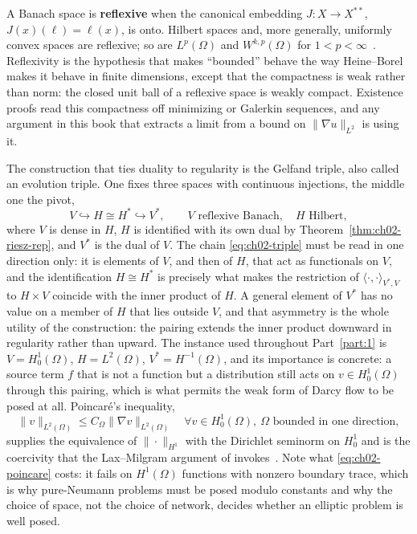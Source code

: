 A Banach space is \textbf{reflexive} when the canonical embedding $J : X \to X^{**}$, $J(x)(\ell) = \ell(x)$, is onto. Hilbert spaces and, more generally, uniformly convex spaces are reflexive; so are $L^p(\Omega)$ and $W^{k,p}(\Omega)$ for $1 < p < \infty$~\cite{brezis2011functional}. Reflexivity is the hypothesis that makes ``bounded'' behave the way Heine--Borel makes it behave in finite dimensions, except that the compactness is weak rather than norm: the closed unit ball of a reflexive space is weakly compact. Existence proofs read this compactness off minimizing or Galerkin sequences, and any argument in this book that extracts a limit from a bound on $\|\nabla u\|_{L^2}$ is using it.

The construction that ties duality to regularity is the Gelfand triple, also called an evolution triple. One fixes three spaces with continuous injections, the middle one the pivot,
\begin{equation}
  V \hookrightarrow H \cong H^* \hookrightarrow V^* , \qquad
  V \text{ reflexive Banach}, \quad H \text{ Hilbert},
  \label{eq:ch02-triple}
\end{equation}
where $V$ is dense in $H$, $H$ is identified with its own dual by Theorem~\ref{thm:ch02-riesz-rep}, and $V^*$ is the dual of $V$. The chain \eqref{eq:ch02-triple} must be read in one direction only: it is elements of $V$, and then of $H$, that act as functionals on $V$, and the identification $H \cong H^*$ is precisely what makes the restriction of $\langle \cdot, \cdot \rangle_{V^*, V}$ to $H \times V$ coincide with the inner product of $H$. A general element of $V^*$ has no value on a member of $H$ that lies outside $V$, and that asymmetry is the whole utility of the construction: the pairing extends the inner product downward in regularity rather than upward. The instance used throughout Part~\ref{part:1} is $V = H^1_0(\Omega)$, $H = L^2(\Omega)$, $V^* = H^{-1}(\Omega)$, and its importance is concrete: a source term $f$ that is not a function but a distribution still acts on $v \in H^1_0(\Omega)$ through this pairing, which is what permits the weak form of Darcy flow to be posed at all. Poincar\'e's inequality,
\begin{equation}
  \|v\|_{L^2(\Omega)} \le C_\Omega \|\nabla v\|_{L^2(\Omega)} \quad \forall v \in H^1_0(\Omega), \ \Omega \text{ bounded in one direction},
  \label{eq:ch02-poincare}
\end{equation}
supplies the equivalence of $\|\cdot\|_{H^1}$ with the Dirichlet seminorm on $H^1_0$ and is the coercivity that the Lax--Milgram argument of  invokes~\cite{evans2010partial}. Note what \eqref{eq:ch02-poincare} costs: it fails on $H^1(\Omega)$ functions with nonzero boundary trace, which is why pure-Neumann problems must be posed modulo constants and why the choice of space, not the choice of network, decides whether an elliptic problem is well posed.

